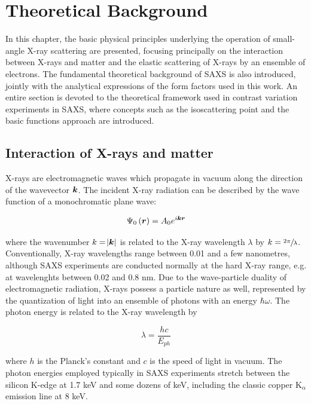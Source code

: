 \chapter{Theoretical Background}
\label{chap:theory_SAXS}
In this chapter, the basic physical principles underlying the operation of small-angle X-ray scattering are presented, focusing principally on the interaction between X-rays and matter and the elastic scattering of X-rays by an ensemble of electrons. The fundamental theoretical background of SAXS is also introduced, jointly with the analytical expressions of the form factors used in this work. An entire section is devoted to the theoretical framework used in contrast variation experiments in SAXS, where concepts such as the isoscattering point and the basic functions approach are introduced.

\section{Interaction of X-rays and matter}

X-rays are electromagnetic waves which propagate in vacuum along the direction of the wavevector $\bm{k}$. The incident X-ray radiation can be described by the wave function of a monochromatic plane wave:

\begin{equation}
        \label{eq:IncidentWave}
        \Psi_0\left( \bm{r} \right)=A_0 e^{i \bm{k}\bm{r} }
\end{equation}

where the wavenumber $k=\abs{\bm{k}}$ is related to the X-ray wavelength $\lambda$ by $k=\sfrac{2\pi}{\lambda}$. Conventionally, X-ray wavelengths range between 0.01 and a few nanometres, although SAXS experiments are conducted normally at the hard X-ray range, e.g. at wavelenghts between 0.02 and 0.8 nm. Due to the wave-particle duality of electromagnetic radiation, X-rays possess a particle nature as well, represented by the quantization of light into an ensemble of photons with an energy $\hbar \omega$. The photon energy is related to the X-ray wavelength by \citep{als-nielsen_elements_2011}

\begin{equation}
        \lambda = \frac{h c}{E_{ph}}
\end{equation}

where $h$ is the Planck's constant and $c$ is the speed of light in vacuum. The photon energies employed typically in SAXS experiments stretch between the silicon K-edge at 1.7 keV and some dozens of keV, including the classic copper K$_{\alpha}$ emission line at 8 keV.

